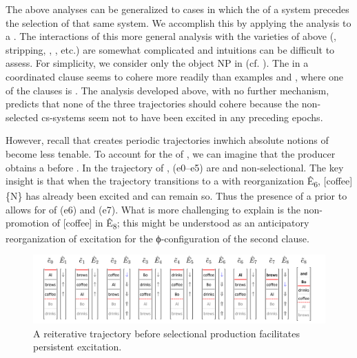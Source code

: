 The above analyses can be generalized to cases in which the  of a system precedes the selection of that same system. We accomplish this by applying the  analysis to a . The interactions of this more general analysis with the varieties of  above (, stripping,  , , etc.) are somewhat complicated and intuitions can be difficult to assess. For simplicity, we consider only the object NP  in  (cf. \citealt{Wilder1997}). The  in a coordinated clause  seems to cohere more readily than examples  and , where one of the clauses is . The  analysis developed above, with no further mechanism, predicts that none of the three trajectories should cohere because the non-selected cs-systems seem not to have been excited in any preceding epochs.

\ea\label{ex:7:7}
\label{ex:7:7a}
\label{ex:7:7b}
\label{ex:7:7c}
\z
\z

  However, recall that  creates periodic trajectories in\linebreak which absolute notions of  become less tenable. To account for the  of , we can imagine that the producer obtains a  before . In the trajectory of {}, (e0--e5) are  and non-selectional. The key insight is that when the trajectory transitions to a  with reorganization Ê\textsubscript{6}, [coffee]\{N\} has already been excited and can remain so. Thus the presence of a  prior to  allows for  of (e6) and (e7). What is more challenging to explain is the non-promotion of [coffee] in Ê\textsubscript{8}; this might be understood as an anticipatory reorganization of excitation for the ϕ-con\-fig\-u\-ra\-tion of the second clause.

  
\begin{figure}
\includegraphics[width=\textwidth]{figures/Tilsen-img150.png}
\caption{A reiterative trajectory before selectional production facilitates persistent excitation.}
\label{fig:7:6}
\end{figure}
 

